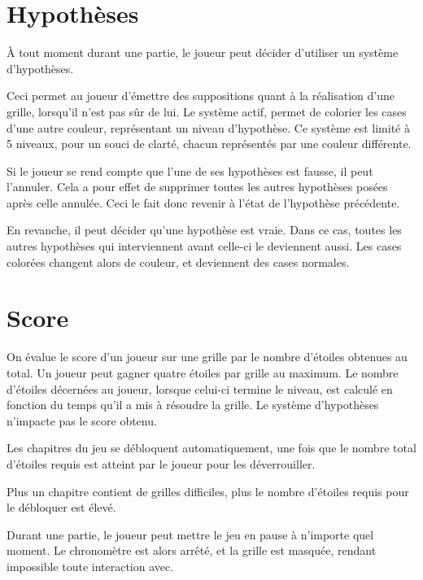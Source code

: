 \documentclass[a4paper, 12pt]{report}
\begin{document}
		\section{Hypothèses}
		\vspace*{0.2cm}
		
			À tout moment durant une partie, le joueur peut décider d'utiliser un système d'hypothèses. 
			
			Ceci permet au joueur d'émettre des suppositions quant à la réalisation d'une grille, lorsqu'il n'est pas sûr de lui. Le système actif, permet de colorier les cases d'une autre couleur, représentant un niveau d'hypothèse. Ce système est limité à 5 niveaux, pour un souci de clarté, chacun représentés par une couleur différente.
			
			Si le joueur se rend compte que l'une de ses hypothèses est fausse, il peut l'annuler. Cela a pour effet de supprimer toutes les autres hypothèses posées après celle annulée. Ceci le fait donc revenir à l'état de l'hypothèse précédente.
			
			En revanche, il peut décider qu'une hypothèse est vraie. Dans ce cas, toutes les autres hypothèses qui interviennent avant celle-ci le deviennent aussi. Les cases colorées changent alors de couleur, et deviennent des cases normales.

		\section{Score}
		\vspace*{0.2cm}
		
			On évalue le score d'un joueur sur une grille par le nombre d'étoiles obtenues au total. Un joueur peut gagner quatre étoiles par grille au maximum. Le nombre d'étoiles décernées au joueur, lorsque celui-ci termine le niveau, est calculé en fonction du temps qu'il a mis à résoudre la grille. Le système d'hypothèses n'impacte pas le score obtenu. 
			
			Les chapitres du jeu se débloquent automatiquement, une fois que le nombre total d'étoiles requis est atteint par le joueur pour les déverrouiller.
			
			Plus un chapitre contient de grilles difficiles, plus le nombre d'étoiles requis pour le débloquer est élevé.
			
			Durant une partie, le joueur peut mettre le jeu en pause à n'importe quel moment. Le chronomètre est alors arrêté, et la grille est masquée, rendant impossible toute interaction avec.
\end{document}
